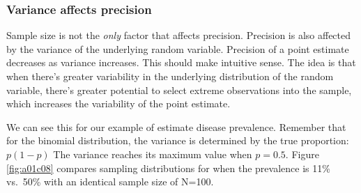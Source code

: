 \documentclass[
]{book}
\begin{document}
\subsubsection{Variance affects precision}\label{variance-affects-precision}

Sample size is not the \emph{only} factor that affects precision. Precision is also affected by the variance of the underlying random variable. Precision of a point estimate decreases as variance increases. This should make intuitive sense. The idea is that when there's greater variability in the underlying distribution of the random variable, there's greater potential to select extreme observations into the sample, which increases the variability of the point estimate.

We can see this for our example of estimate disease prevalence. Remember that for the binomial distribution, the variance is determined by the true proportion: \(p(1-p)\) The variance reaches its maximum value when \(p = 0.5\). Figure \ref{fig:a01c08} compares sampling distributions for when the prevalence is 11\% vs.~50\% with an identical sample size of N=100.
\end{document}
